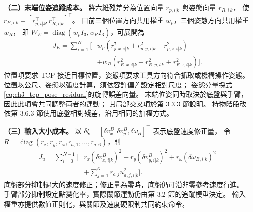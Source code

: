 \noindent\textbf{（二）末端位姿追蹤成本。}
將六維殘差分為位置向量 $r_{p,i|k}$ 與姿態向量 $r_{R,i|k}$，
使 $r_{E,i|k}=[r_{p,i|k}^\top,r_{R,i|k}^\top]^\top$。
目前三個位置方向共用權重 $w_p$，三個姿態方向共用權重 $w_R$，
即 $W_E=\operatorname{diag}(w_p I_3,w_R I_3)$，可展開為
\begin{equation}
    \begin{aligned}
        J_E=\sum_{i=1}^{N}\big[&
        w_p(r_{p,x,i|k}^{2}+r_{p,y,i|k}^{2}+r_{p,z,i|k}^{2})\\
        &+w_R(r_{R,x,i|k}^{2}+r_{R,y,i|k}^{2}+r_{R,z,i|k}^{2})\big].
    \end{aligned}
    \label{eq:ch3_tcp_tracking_cost_expanded}
\end{equation}
位置項要求 TCP 接近目標位置，姿態項要求工具方向符合抓取或機構操作姿態。
位置以公尺、姿態以弧度計算，須依容許偏差設定相對尺度；
姿態分量採式\eqref{eq:ch3_tcp_pose_residual}的旋轉誤差向量。
末端位姿同時取決於底盤與手臂，因此此項會共同調整兩者的運動；
其局部交叉項於第 3.3.3 節說明。
持物階段改依第 3.6.3 節使用底盤相對殘差，沿用相同的加權方式。

\noindent\textbf{（三）輸入大小成本。}
以 $\delta\xi=[\delta v_x^B,\delta v_y^B,\delta\omega_B]^\top$ 表示底盤速度修正量，
令 $R=\operatorname{diag}(r_x,r_y,r_\omega,r_{a,1},\ldots,r_{a,6})$，則
\begin{equation}
    \begin{aligned}
        J_u=\sum_{i=0}^{N-1}\big[&
        r_x(\delta v_{x,i|k}^{B})^{2}
        +r_y(\delta v_{y,i|k}^{B})^{2}
        +r_\omega(\delta\omega_{B,i|k})^{2}\\
        &+\sum_{j=1}^{6}r_{a,j}u_{a,j,i|k}^{2}\big].
    \end{aligned}
    \label{eq:ch3_input_cost_expanded}
\end{equation}
底盤部分抑制過大的速度修正；修正量為零時，底盤仍可沿非零參考速度行進。
手臂部分抑制設定點變化率，實際關節運動仍由第 3.2 節的追蹤模型決定。
輸入權重亦提供數值正則化，與關節及速度硬限制共同約束命令。

